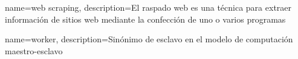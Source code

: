 
{
    name=web scraping,
    description={El raspado web es una técnica para extraer información de sitios web mediante la confección de uno o varios programas}
}

{
    name=worker,
    description={Sinónimo de esclavo en el modelo de computación maestro-esclavo}
}


